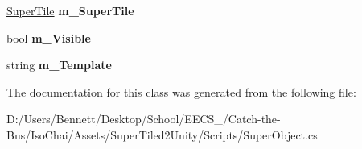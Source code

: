 \begin{DoxyCompactItemize}
\item 
\mbox{\label{class_super_tiled2_unity_1_1_super_object_a1e3adf15b460e5f281737f76ae40f6ad}} 
\mbox{\hyperlink{class_super_tiled2_unity_1_1_super_tile}{Super\+Tile}} {\bfseries m\+\_\+\+Super\+Tile}
\item 
\mbox{\label{class_super_tiled2_unity_1_1_super_object_a49994c203b920c76cc2c166e4d9476ed}} 
bool {\bfseries m\+\_\+\+Visible}
\item 
\mbox{\label{class_super_tiled2_unity_1_1_super_object_aa7be6652b150a9bae8b65005afbff499}} 
string {\bfseries m\+\_\+\+Template}
\end{DoxyCompactItemize}


The documentation for this class was generated from the following file\+:\begin{DoxyCompactItemize}
\item 
D\+:/\+Users/\+Bennett/\+Desktop/\+School/\+E\+E\+C\+S\+\_/\+Catch-\/the-\/\+Bus/\+Iso\+Chai/\+Assets/\+Super\+Tiled2\+Unity/\+Scripts/Super\+Object.\+cs\end{DoxyCompactItemize}
